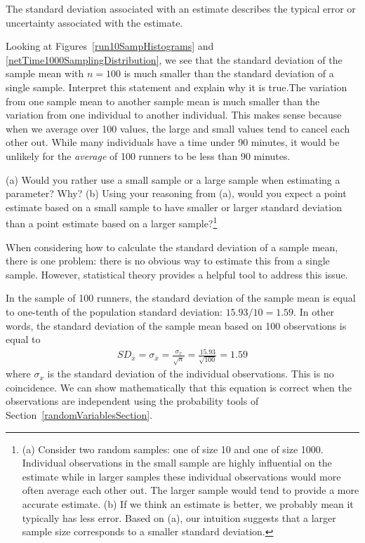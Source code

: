 \begin{termBox}{
The standard deviation associated with an estimate describes the typical error or uncertainty associated with the estimate.}
\end{termBox}

\begin{example}{Looking at Figures~\ref{run10SampHistograms} and \ref{netTime1000SamplingDistribution}, we see that the standard deviation of the sample mean with $n=100$ is much smaller than the standard deviation of a single sample.  Interpret this statement and explain why it is true.}The variation from one sample mean to another sample mean is much smaller than the variation from one individual to another individual.  This makes sense because when we average over 100 values, the large and small values tend to cancel each other out.  While many individuals have a time under 90 minutes, it would be unlikely for the \emph{average} of 100 runners to be less than 90 minutes.
\end{example}

\begin{exercise}
(a) Would you rather use a small sample or a large sample when estimating a parameter? Why? (b) Using your reasoning from (a), would you expect a point estimate based on a small sample to have smaller or larger standard deviation than a point estimate based on a larger sample?\footnote{(a) Consider two random samples: one of size 10 and one of size 1000. Individual observations in the small sample are highly influential on the estimate while in larger samples these individual observations would more often average each other out. The larger sample would tend to provide a more accurate estimate. (b) If we think an estimate is better, we probably mean it typically has less error. Based on (a), our intuition suggests that a larger sample size corresponds to a smaller standard deviation.}
\end{exercise}

When considering how to calculate the standard deviation of a sample mean, there is one problem: there is no obvious way to estimate this from a single sample.  However, statistical theory provides a helpful tool to address this issue.

In the sample of 100 runners, the standard deviation of the sample mean is equal to one-tenth of the population standard deviation: $15.93/10 = 1.59$. In other words, the standard deviation of the sample mean based on 100 observations is equal to
\begin{eqnarray*}
SD_{\bar{x}} = \sigma_{\bar{x}} = \frac{\sigma_{x}}{\sqrt{n}} = \frac{15.93}{\sqrt{100}} = 1.59
\end{eqnarray*}
where $\sigma_{x}$ is the standard deviation of the individual observations. This is no coincidence. We can show mathematically that this equation is correct when the observations are independent  using the probability tools of Section~\ref{randomVariablesSection}.

